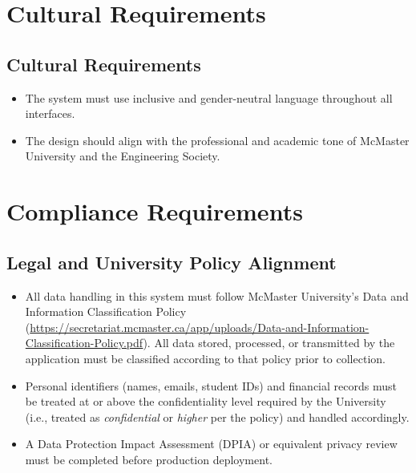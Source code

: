 \documentclass[12pt]{article}
\begin{document}
\section{Cultural Requirements}

\subsection{Cultural Requirements}
\begin{itemize}
    \item The system must use inclusive and gender-neutral language throughout all interfaces.
    \item The design should align with the professional and academic tone of McMaster University and the Engineering Society.
\end{itemize}

\section{Compliance Requirements}

\subsection{Legal and University Policy Alignment}
\begin{itemize}
  \item All data handling in this system must follow McMaster University's Data and Information Classification Policy (\url{https://secretariat.mcmaster.ca/app/uploads/Data-and-Information-Classification-Policy.pdf}).  All data stored, processed, or transmitted by the application must be classified according to that policy prior to collection.
  \item Personal identifiers (names, emails, student IDs) and financial records must be treated at or above the confidentiality level required by the University (i.e., treated as \textit{confidential} or \textit{higher} per the policy) and handled accordingly.
  \item A Data Protection Impact Assessment (DPIA) or equivalent privacy review must be completed before production deployment.
\end{itemize}
\end{document}
